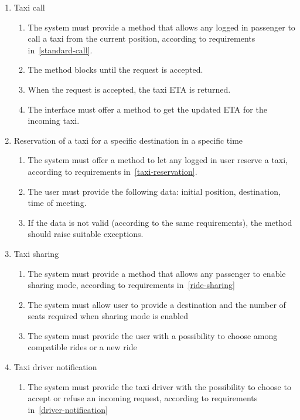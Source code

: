 \begin{enumerate}
\begin{enumerate}
\end{enumerate}
\item Taxi call
\begin{enumerate}
    \item The system must provide a method that allows any logged in passenger to call a taxi from the current position, according to requirements in~\autoref{standard-call}.
    \item The method blocks until the request is accepted.
    \item When the request is accepted, the taxi ETA is returned.
    \item The interface must offer a method to get the updated ETA for the incoming taxi.
\end{enumerate}

\item Reservation of a taxi for a specific destination in a specific time
\begin{enumerate}
    \item The system must offer a method to let any logged in user reserve a taxi, according to requirements in~\autoref{taxi-reservation}.
    \item The user must provide the following data: initial position, destination, time of meeting.
    \item If the data is not valid (according to the same requirements), the method should raise suitable exceptions.
\end{enumerate}

\item Taxi sharing
\begin{enumerate}
	\item The system must provide a method that allows any passenger to enable sharing mode, according to requirements in~\autoref{ride-sharing}
	\item The system must allow user to provide a destination and the number of seats required when sharing mode is enabled
	\item The system must provide the user with a possibility to choose among compatible rides or a new ride
\end{enumerate}
\item Taxi driver notification
\begin{enumerate}
	\item The system must provide the taxi driver with the possibility to choose to accept or refuse an incoming request, according to requirements in~\autoref{driver-notification}
\end{enumerate}

\end{enumerate}
